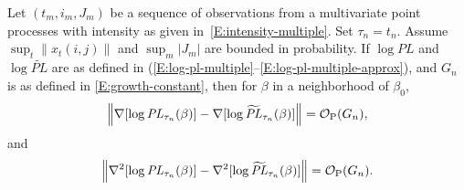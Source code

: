 \documentclass[aoas,preprint]{imsart}
\begin{document}
\begin{theorem}\label{T:log-pl-multiple-approx-error}
    Let $(t_m, i_m, J_m)$ be a sequence of observations from a multivariate
    point processes with intensity as given in~\eqref{E:intensity-multiple}.
    Set $\tau_n = t_n$.  Assume
    \(
        \sup_t \| x_t (i,j) \|
    \)
    and
    \(
        \sup_m | J_m |
    \)
    are bounded in probability.
    If $\log \mathit{PL}$ and $\log \widetilde{\mathit{PL}}$ are as
    defined in
    \textnormal{(}\ref{E:log-pl-multiple}--\ref{E:log-pl-multiple-approx}\textnormal{)},
    and $G_n$ is as defined in \eqref{E:growth-constant},
    then for $\beta$ in a neighborhood of $\beta_0$,
    \[
        \Big\|
        \nabla [\log \mathit{PL}_{\tau_n}(\beta) ]
        -
        \nabla [\log \widetilde{\mathit{PL}}_{\tau_n}(\beta) ]
        \Big\|
            =
            \mathcal{O}_\text{P}(G_n),
    \]
    and
    \[
        \Big\|
        \nabla^2 [\log \mathit{PL}_{\tau_n}(\beta) ]
        -
        \nabla^2 [\log \widetilde{\mathit{PL}}_{\tau_n}(\beta) ]
        \Big\|
            =
            \mathcal{O}_\text{P}(G_n).
    \]
\end{theorem}
\end{document}
